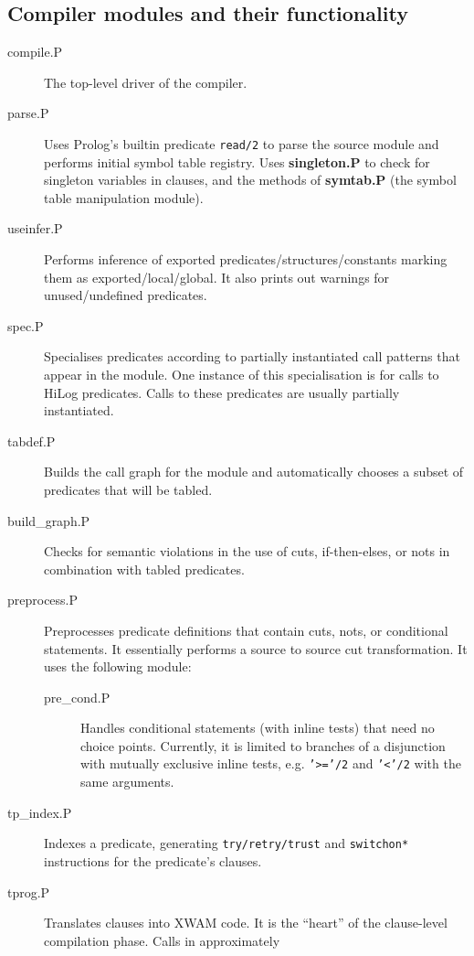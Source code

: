 \subsection{Compiler modules and their functionality}
\begin{description}
\item[compile.P] The top-level driver of the compiler.
\item[parse.P]	Uses Prolog's builtin predicate {\tt read/2} to parse
		the source module and performs initial symbol table registry.
		Uses {\bf singleton.P} to check for singleton variables in
		clauses, and the methods of {\bf symtab.P} (the symbol table
		manipulation module).
\item[useinfer.P]
		Performs inference of exported predicates/structures/constants
		marking them as exported/local/global.  It also prints out
		warnings for unused/undefined predicates.
\item[spec.P]	Specialises predicates according to partially instantiated
		call patterns that appear in the module.  One instance of this
		specialisation is for calls to HiLog predicates.  Calls to
		these predicates are usually partially instantiated.
\item[tabdef.P] Builds the call graph for the module and automatically chooses
		a subset of predicates that will be tabled.
\item[build\_graph.P]
		Checks for semantic violations in the use of cuts,
		if-then-elses, or nots in combination with tabled predicates.
\item[preprocess.P]
		Preprocesses predicate definitions that contain cuts, nots,
		or conditional statements.  It essentially performs
		a source to source cut transformation.  It uses the
		following module:
	\begin{description}
	\item[pre\_cond.P] Handles conditional statements (with inline tests)
		that need no choice points.  Currently, it is limited to
		branches of a disjunction with mutually exclusive inline
		tests, e.g. {\tt '>='/2} and {\tt '<'/2} with the same
		arguments.
	\end{description}
\item[tp\_index.P] Indexes a predicate, generating {\tt try/retry/trust}
		and {\tt switchon*} instructions for the predicate's clauses.
\item[tprog.P]	Translates clauses into XWAM code.  It is the ``heart''
		of the clause-level compilation phase. Calls in approximately

\end{description}
